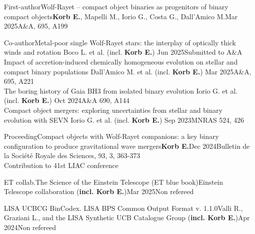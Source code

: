 %
%
%

\begin{experiences}
    \publicationtags
    {First-author}{Wolf-Rayet -- compact object binaries as progenitors of binary compact objects}{\textbf{Korb E.}, Mapelli M., Iorio G., Costa G., Dall'Amico M.}{Mar 2025}{A\&A, 695, A199 }{}
    \emptySeparator

    \publicationtags
    {Co-author}{Metal-poor single Wolf-Rayet stars: the interplay of optically thick winds and rotation}
    {Boco L. et al. (incl. \textbf{Korb E.})}
    {Jun 2025}{Submitted to A\&A}
    {} 
    \\
    \bigskip
    \publicationtags
    {}{Impact of accretion-induced chemically homogeneous evolution on stellar and compact binary populations}
    {Dall'Amico M. et al. (incl. \textbf{Korb E.})}
    {Mar 2025}{A\&A, 695, A221}
    {} 
    \\
    \bigskip
    \publicationtags
    {}{The boring history of Gaia BH3 from isolated binary evolution}
    {Iorio G. et al. (incl. \textbf{Korb E.})}
    {Oct 2024}{A\&A 690, A144}
    {} 
    \\
    \bigskip
    \publicationtags
    {}{Compact object mergers: exploring uncertainties from stellar and binary evolution with SEVN}
    {Iorio G. et al. (incl. \textbf{Korb E.})}
    {Sep 2023}{MNRAS 524, 426}
    {}    
    \emptySeparator
    
    \publicationtags
    {Proceeding}{Compact objects with Wolf-Rayet companions: a key binary configuration to produce gravitational wave mergers}{\textbf{Korb E.}}{Dec 2024}{Bulletin de la Société Royale des Sciences, 93, 3, 363-373 \\ Contribution to 41st LIAC conference}{}
    \emptySeparator
    
    \publicationtags
    {ET collab.}{The Science of the Einstein Telescope (ET blue book)}{Einstein Telescope collaboration (\textbf{incl. Korb E.})}{Mar 2025}{Non refereed}{}
    \emptySeparator
    
    \publicationtags
    {LISA UCBCG }{BinCodex. LISA BPS Common Output Format v. 1.1.0}{Valli R.,  Graziani L., and the LISA Synthetic UCB Catalogue Group (\textbf{incl. Korb E.})}{Apr 2024}{Non refereed}{}
\end{experiences}